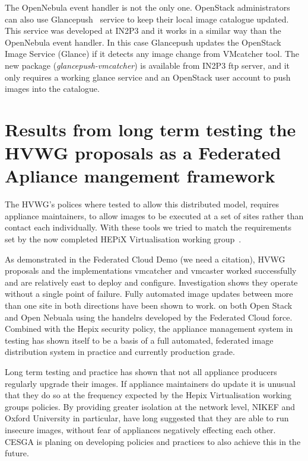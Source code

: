 \documentclass{llncs_Ibergrid2013}
\begin{document}
The OpenNebula event handler is not the only one. OpenStack administrators can also use Glancepush~\cite{glancepush} service to keep their local image catalogue updated. 
This service was developed at IN2P3 and it works in a similar way than the OpenNebula event handler. 
In this case Glancepush updates the OpenStack Image Service (Glance) if it detects any image change from VMcatcher tool. 
The new package (\textit{glancepush-vmcatcher}) is available from IN2P3 ftp server, and it only requires a working glance service and an OpenStack user account to push images into the catalogue.



\section{Results from long term testing the HVWG proposals as a Federated Apliance mangement framework}
\label{sect-experiances}

The HVWG's polices where tested to allow this distributed model, requires appliance maintainers, to allow images to be executed at a set of sites rather than contact each individually. With these tools we tried to match the requirements set by the now completed HEPiX Virtualisation working group~\cite{hepix}.

As demonstrated in the Federated Cloud Demo (we need a citation), HVWG proposals and the implementations vmcatcher and vmcaster worked successfully and are relatively east to deploy and configure. Investigation shows they operate without a single point of failure. Fully automated image updates between more than one site in both directions have been shown to work. on both Open Stack and Open Nebuala using the handelrs developed by the Federated Cloud force. Combined with the Hepix security policy, the appliance management system in testing has shown itself to be a basis of a full automated, federated image distribution system in practice and currently production grade.

Long term testing and practice has shown that not all appliance producers regularly upgrade their images. If appliance maintainers do update it is unusual that they do so at the frequency expected by the Hepix Virtualisation working groups policies. By providing greater isolation at the network level, NIKEF and Oxford University in particular, have long suggested that they are able to run insecure images, without fear of appliances negatively effecting each other. CESGA is planing on developing policies and practices to also achieve this in the future.
\end{document}
